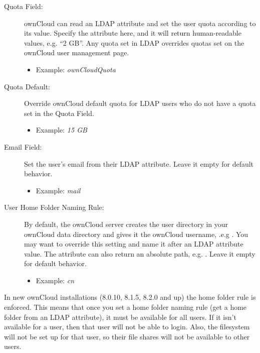 \documentclass[letterpaper,10pt,english]{sphinxmanual}
\begin{document}
\begin{description}
\item[{Quota Field:}] \leavevmode
ownCloud can read an LDAP attribute and set the user quota according to its
value. Specify the attribute here, and it will return human-readable values,
e.g. ``2 GB''. Any quota set in LDAP overrides quotas set on the ownCloud user
management page.
\begin{itemize}
\item {} 
Example: \emph{ownCloudQuota}

\end{itemize}

\item[{Quota Default:}] \leavevmode
Override ownCloud default quota for LDAP users who do not have a quota set in
the Quota Field.
\begin{itemize}
\item {} 
Example: \emph{15 GB}

\end{itemize}

\item[{Email Field:}] \leavevmode
Set the user's email from their LDAP attribute. Leave it empty for default
behavior.
\begin{itemize}
\item {} 
Example: \emph{mail}

\end{itemize}

\item[{User Home Folder Naming Rule:}] \leavevmode
By default, the ownCloud server creates the user directory in your ownCloud
data directory and gives it the ownCloud username, .e.g . You may want to override this setting and name it after an LDAP
attribute value. The attribute can also return an absolute path, e.g.
. Leave it empty for default behavior.
\begin{itemize}
\item {} 
Example: \emph{cn}

\end{itemize}

\end{description}

In new ownCloud installations (8.0.10, 8.1.5, 8.2.0 and up) the home folder rule is enforced. This means that once you set a home folder naming rule (get a home folder from an LDAP attribute), it must be available for all users. If it isn't available for a user, then that user will not be able to login. Also, the filesystem will not be set up for that user, so their file shares will not be available to other users.
\end{document}
